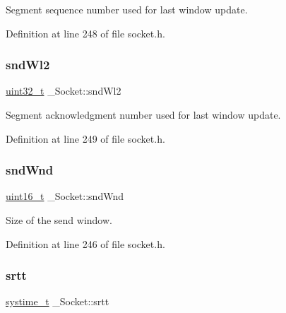 Segment sequence number used for last window update. 



Definition at line 248 of file socket.\+h.

\mbox{\label{struct__Socket_a34ee9c14a49e2965f93bbf6ce3540e93}} 
\subsubsection{\texorpdfstring{snd\+Wl2}{sndWl2}}
{\footnotesize\ttfamily \hyperlink{stdint_8h_a435d1572bf3f880d55459d9805097f62}{uint32\+\_\+t} \+\_\+\+Socket\+::snd\+Wl2}



Segment acknowledgment number used for last window update. 



Definition at line 249 of file socket.\+h.

\mbox{\label{struct__Socket_a117c709f1b5ed3943578618b3c509d35}} 
\subsubsection{\texorpdfstring{snd\+Wnd}{sndWnd}}
{\footnotesize\ttfamily \hyperlink{stdint_8h_a273cf69d639a59973b6019625df33e30}{uint16\+\_\+t} \+\_\+\+Socket\+::snd\+Wnd}



Size of the send window. 



Definition at line 246 of file socket.\+h.

\mbox{\label{struct__Socket_ae2be6dc034b284b76490589bb9d7aba3}} 
\subsubsection{\texorpdfstring{srtt}{srtt}}
{\footnotesize\ttfamily \hyperlink{compiler__port_8h_ae3e32a98d431a02106616da3071832dd}{systime\+\_\+t} \+\_\+\+Socket\+::srtt}



